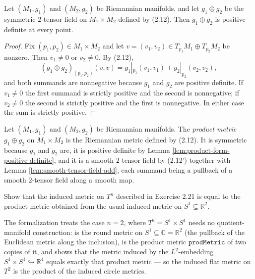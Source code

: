 \begin{lemma}
\label{lem:product-form-positive-definite}
\leanok
{}
Let $(M_1,g_1)$ and $(M_2,g_2)$ be Riemannian manifolds, and let $g_1 \oplus g_2$ be the symmetric $2$-tensor field on $M_1 \times M_2$ defined by (2.12). Then $g_1 \oplus g_2$ is positive definite at every point.
\end{lemma}

\begin{proof}
\leanok
{}
Fix $(p_1,p_2) \in M_1 \times M_2$ and let $v = (v_1,v_2) \in T_{p_1}M_1 \oplus T_{p_2}M_2$ be nonzero. Then $v_1 \neq 0$ or $v_2 \neq 0$. By (2.12),
\[
(g_1 \oplus g_2)_{(p_1,p_2)}(v,v) = g_1|_{p_1}(v_1,v_1) + g_2|_{p_2}(v_2,v_2),
\]
and both summands are nonnegative because $g_1$ and $g_2$ are positive definite. If $v_1 \neq 0$ the first summand is strictly positive and the second is nonnegative; if $v_2 \neq 0$ the second is strictly positive and the first is nonnegative. In either case the sum is strictly positive.
\end{proof}

\begin{definition}
\label{def:product-metric}
\leanok
{}
Let $(M_1,g_1)$ and $(M_2,g_2)$ be Riemannian manifolds. The \emph{product metric} $g_1 \oplus g_2$ on $M_1 \times M_2$ is the Riemannian metric defined by (2.12). It is symmetric because $g_1$ and $g_2$ are, it is positive definite by Lemma \ref{lem:product-form-positive-definite}, and it is a smooth $2$-tensor field by (2.12') together with Lemma \ref{lem:smooth-tensor-field-add}, each summand being a pullback of a smooth $2$-tensor field along a smooth map.
\end{definition}

\begin{exercise}
\label{exer:product-metric-torus}
\leanok
{}
Show that the induced metric on $T^n$ described in Exercise 2.21 is equal to the product metric obtained from the usual induced metric on $S^1 \subseteq \mathbb{R}^2$.

The formalization treats the case $n = 2$, where $T^2 = S^1 \times S^1$ needs no quotient-manifold construction:  is the round metric on $S^1 \subseteq \mathbb{C} = \mathbb{R}^2$ (the pullback of the Euclidean metric along the inclusion),  is the product metric $\mathtt{prodMetric}$ of two copies of it, and  shows that the metric induced by the $L^2$-embedding $S^1 \times S^1 \hookrightarrow \mathbb{R}^4$ equals exactly that product metric --- so the induced flat metric on $T^2$ is the product of the induced circle metrics.
\end{exercise}

